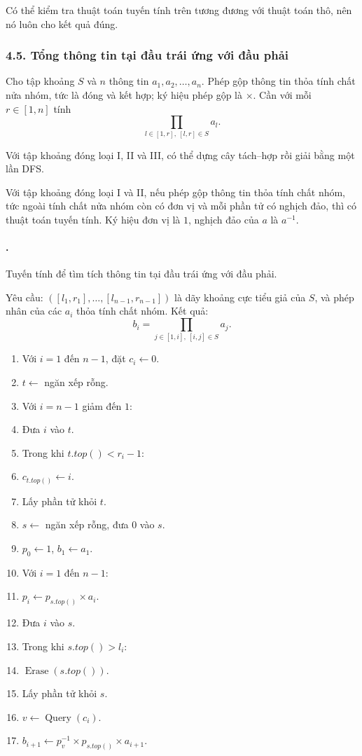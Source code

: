 \documentclass[11pt]{article}
\begin{document}
Có thể kiểm tra thuật toán tuyến tính trên tương đương với thuật toán thô, nên
nó luôn cho kết quả đúng.

\subsubsection*{4.5. Tổng thông tin tại đầu trái ứng với đầu phải}

Cho tập khoảng $S$ và $n$ thông tin $a_1,a_2,\ldots,a_n$. Phép gộp thông tin
thỏa tính chất nửa nhóm, tức là đóng và kết hợp; ký hiệu phép gộp là $\times$.
Cần với mỗi $r\in[1,n]$ tính
\[
  \prod_{l\in[1,r],\ [l,r]\in S} a_l.
\]

Với tập khoảng đóng loại I, II và III, có thể dựng cây tách--hợp rồi giải
bằng một lần DFS.

Với tập khoảng đóng loại I và II, nếu phép gộp thông tin thỏa tính chất nhóm,
tức ngoài tính chất nửa nhóm còn có đơn vị và mỗi phần tử có nghịch đảo, thì
có thuật toán tuyến tính. Ký hiệu đơn vị là $1$, nghịch đảo của $a$ là
$a^{-1}$.

\paragraph{.}
Tuyến tính để tìm tích thông tin tại đầu trái ứng với đầu phải.

Yêu cầu:
$([l_1,r_1],\ldots,[l_{n-1},r_{n-1}])$ là dãy khoảng cực tiểu giả của $S$, và
phép nhân của các $a_i$ thỏa tính chất nhóm. Kết quả:
\[
  b_i=\prod_{j\in[1,i],\ [i,j]\in S} a_j.
\]
\begin{enumerate}
  \item Với $i=1$ đến $n-1$, đặt $c_i\leftarrow0$.
  \item $t\leftarrow$ ngăn xếp rỗng.
  \item Với $i=n-1$ giảm đến $1$:
  \item \quad Đưa $i$ vào $t$.
  \item \quad Trong khi $t.top()<r_i-1$:
  \item \quad\quad $c_{t.top()}\leftarrow i$.
  \item \quad\quad Lấy phần tử khỏi $t$.
  \item $s\leftarrow$ ngăn xếp rỗng, đưa $0$ vào $s$.
  \item $p_0\leftarrow1$, $b_1\leftarrow a_1$.
  \item Với $i=1$ đến $n-1$:
  \item \quad $p_i\leftarrow p_{s.top()}\times a_i$.
  \item \quad Đưa $i$ vào $s$.
  \item \quad Trong khi $s.top()>l_i$:
  \item \quad\quad $\operatorname{Erase}(s.top())$.
  \item \quad\quad Lấy phần tử khỏi $s$.
  \item \quad $v\leftarrow\operatorname{Query}(c_i)$.
  \item \quad $b_{i+1}\leftarrow p_v^{-1}\times p_{s.top()}\times a_{i+1}$.
\end{enumerate}
\end{document}
